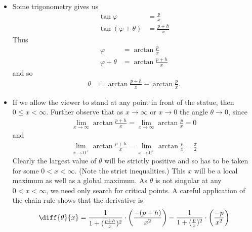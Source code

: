 \begin{eg}
\begin{itemize}
\item Some trigonometry gives us
\begin{align*}
\tan \varphi &= \frac{p}{x} \\
\tan (\varphi+\theta) &= \frac{p+h}{x}
\end{align*}
Thus
\begin{align*}
  \varphi &= \arctan \frac{p}{x} \\
  \varphi+\theta &= \arctan \frac{p+h}{x}
\end{align*}
and so
\begin{align*}
  \theta &= \arctan \frac{p+h}{x} - \arctan\frac{p}{x}.
\end{align*}
\item If we allow the viewer to stand at any point in front of the statue, then $0\le x
<\infty$. Further observe that as $x \rightarrow \infty$ or $x \rightarrow 0$ the angle
$\theta \rightarrow 0$,  since
\begin{align*}
  \lim_{x\rightarrow \infty} \arctan \frac{p+h}{x} =
  \lim_{x\rightarrow \infty} \arctan \frac{p}{x} = 0 
\end{align*}
and
\begin{align*}
  \lim_{x\rightarrow 0^+} \arctan \frac{p+h}{x} = 
  \lim_{x\rightarrow 0^+} \arctan \frac{p}{x} = \frac{\pi}{2} 
\end{align*}
Clearly the largest value of $\theta$ will be strictly positive and so has to be taken for
some $0<x<\infty$. (Note the strict inequalities.) This $x$ will be a local maximum as
well as a global maximum. As $\theta$ is not singular at any $0<x<\infty$, we need only
search for critical points.
A careful application of the chain rule shows that
the derivative is
\begin{align*}
  \diff{\theta}{x}
  &=
  \frac{1}{1+(\frac{p+h}{x})^2}\cdot \left(\frac{-(p+h)}{x^2}\right) -
  \frac{1}{1+(\frac{p}{x})^2}\cdot \left(\frac{-p}{x^2}\right)\\

\end{align*}
\end{itemize}
\end{eg}
